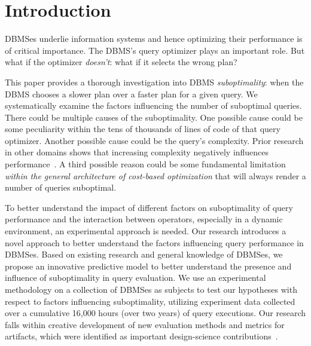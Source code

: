 \documentclass[prodmode,acmtods]{acmsmall}
\begin{document}
\maketitle

\section{Introduction}\label{sec:intro}
DBMSes underlie information systems and hence optimizing their performance is of
critical importance. The DBMS's query optimizer plays an important role. But
what if the optimizer {\em doesn't}: what if it selects the wrong plan?

This paper provides a thorough investigation into \hbox{DBMS} {\em
  suboptimality}: when the \hbox{DBMS} chooses a slower plan over a faster
plan for a given query. We systematically examine the factors influencing
the number of suboptimal queries. There could be multiple causes of the
suboptimality. One possible cause could be some peculiarity within the tens
of thousands of lines of code of that query optimizer. Another possible
cause could be the query's complexity. Prior research in other domains shows
that increasing complexity negatively influences
performance~\cite{campbell88,moody98}. A third possible reason could be some
fundamental limitation {\em within the general architecture of cost-based
  optimization} that will always render a number of queries suboptimal.

To better understand the impact of different factors on suboptimality of
query performance and the interaction between operators, especially in a
dynamic environment, an experimental approach is needed.
Our research introduces a novel approach
to better understand the factors influencing query performance in
\hbox{DBMSes}. Based on existing research and general knowledge of \hbox{DBMSes}, we
propose an innovative predictive model to better understand the presence and influence
of suboptimality in query evaluation. We use an experimental methodology on
a collection of \hbox{DBMSes} as subjects to test our hypotheses with respect to factors
influencing suboptimality, utilizing
experiment data collected over a \hbox{cumulative} 16,000 hours (over two
years) of query executions.
Our research falls within creative development of
new evaluation methods and metrics for artifacts, which were identified as
important design-science contributions~\cite{hevner04}.
\end{document}
